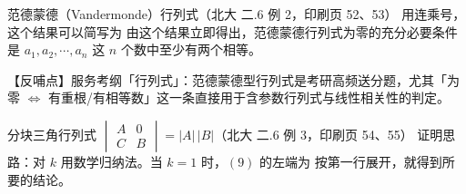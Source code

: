 \begin{fdeep}{范德蒙德（Vandermonde）行列式（北大 二.6 例 2，印刷页 52、53）}
用连乘号，这个结果可以简写为
由这个结果立即得出，范德蒙德行列式为零的充分必要条件是 $a_1,a_2,\cdots,a_n$ 这 $n$ 个数中至少有两个相等。

【反哺点】服务考纲「行列式」：范德蒙德型行列式是考研高频送分题，尤其「为零 $\Leftrightarrow$ 有重根/有相等数」这一条直接用于含参数行列式与线性相关性的判定。
\end{fdeep}

\begin{fdeep}{分块三角行列式 $\begin{vmatrix}A&0\\C&B\end{vmatrix}=|A|\,|B|$（北大 二.6 例 3，印刷页 54、55）}
证明思路：对 $k$ 用数学归纳法。当 $k=1$ 时，$(9)$ 的左端为
按第一行展开，就得到所要的结论。


\end{fdeep}

